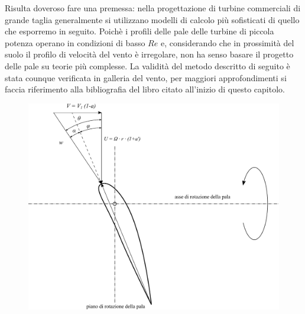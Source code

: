 Risulta doveroso fare una premessa: nella progettazione di turbine commerciali di grande taglia generalmente si utilizzano modelli di calcolo più sofisticati di quello che esporremo in seguito. Poichè i profili delle pale delle turbine di piccola potenza operano in condizioni di basso $Re$ e, considerando che in prossimità del suolo il profilo di velocità del vento è irregolare, non ha senso basare il progetto delle pale su teorie più complesse. La validità del metodo descritto di seguito è stata counque verificata in galleria del vento, per maggiori approfondimenti si faccia riferimento alla bibliografia del libro citato all'inizio di questo capitolo. 






\begin{figure}
\centering
  \includegraphics[width=\textwidth]{fig/triangEol2.pdf}
\caption{}
\label{fig:triangEol2}
\end{figure}

